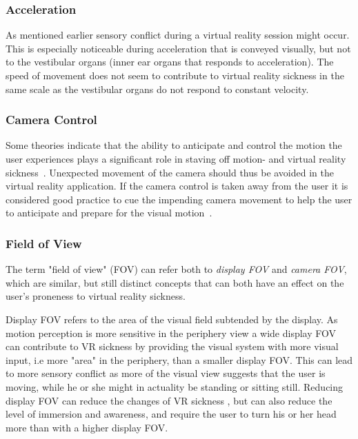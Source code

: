 \subsubsection{Acceleration}
As mentioned earlier sensory conflict during a virtual reality session might occur. This is especially noticeable during acceleration that is conveyed visually, but 
not to the vestibular organs (inner ear organs that responds to acceleration). The speed of movement does not seem to contribute to virtual reality sickness in the same scale
as the vestibular organs do not respond to constant velocity. %

\subsubsection{Camera Control}
\label{sec:camera_control}
Some theories indicate that the ability to anticipate and control the motion the user experiences plays a significant role in staving off motion- 
and virtual reality sickness~\citep{Rolnick1991}. Unexpected movement of the camera should thus be avoided in the virtual reality application. 
If the camera control is taken away from the user it is considered good practice to cue the impending camera movement to help the user to anticipate and prepare for 
the visual motion~\citep{Lin2004}.

\subsubsection{Field of View}
\label{sec:fov}
The term "field of view" (FOV) can refer both to \textit{display FOV} and \textit{camera FOV}, which are similar, 
but still distinct concepts that can both have an effect on the user's proneness to virtual reality sickness. 

Display FOV refers to the area of the visual field subtended by the display. As motion perception is more sensitive in the periphery view 
a wide display FOV can contribute to VR sickness by providing the visual system with more visual input, i.e more "area" in the periphery, than a smaller display FOV. 
This can lead to more sensory conflict as more of the visual view suggests that the user is moving, while he or she might in actuality be standing or sitting still.
Reducing display FOV can reduce the changes of VR sickness \citep{Draper2001}, but can also reduce the level of immersion and awareness, and require the user to turn his or her head more
than with a higher display FOV.

